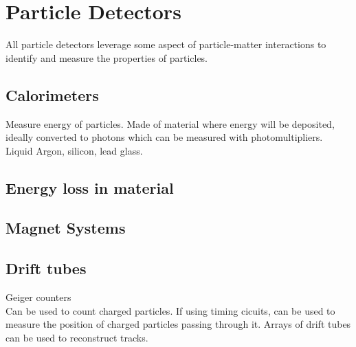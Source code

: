 \section{Particle Detectors}
All particle detectors leverage some aspect of particle-matter interactions to identify and measure the properties of particles.
\subsection{Calorimeters}
Measure energy of particles. Made of material where energy will be deposited, ideally converted to photons which can be measured with photomultipliers. Liquid Argon, silicon, lead glass.
\subsection{Energy loss in material}
\subsection{Magnet Systems}
\subsection{Drift tubes}
Geiger counters\\
Can be used to count charged particles. If using timing cicuits, can be used to measure the position of charged particles passing through it. Arrays of drift tubes can be used to reconstruct tracks.